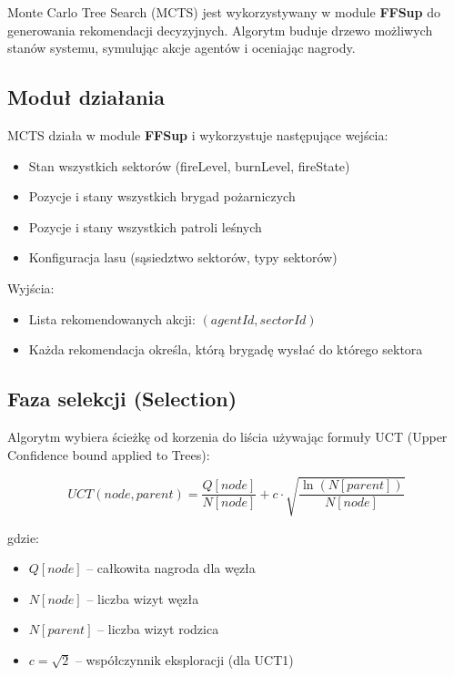 Monte Carlo Tree Search (MCTS) jest wykorzystywany w module \textbf{FFSup} do generowania rekomendacji decyzyjnych. Algorytm buduje drzewo możliwych stanów systemu, symulując akcje agentów i oceniając nagrody.

\subsection{Moduł działania}

MCTS działa w module \textbf{FFSup} i wykorzystuje następujące wejścia:
\begin{itemize}
    \item Stan wszystkich sektorów (fireLevel, burnLevel, fireState)
    \item Pozycje i stany wszystkich brygad pożarniczych
    \item Pozycje i stany wszystkich patroli leśnych
    \item Konfiguracja lasu (sąsiedztwo sektorów, typy sektorów)
\end{itemize}

Wyjścia:
\begin{itemize}
    \item Lista rekomendowanych akcji: $(agentId, sectorId)$
    \item Każda rekomendacja określa, którą brygadę wysłać do którego sektora
\end{itemize}

\subsection{Faza selekcji (Selection)}

Algorytm wybiera ścieżkę od korzenia do liścia używając formuły UCT (Upper Confidence bound applied to Trees):

\begin{equation}
UCT(node, parent) = \frac{Q[node]}{N[node]} + c \cdot \sqrt{\frac{\ln(N[parent])}{N[node]}}
\end{equation}

gdzie:
\begin{itemize}
    \item $Q[node]$ -- całkowita nagroda dla węzła
    \item $N[node]$ -- liczba wizyt węzła
    \item $N[parent]$ -- liczba wizyt rodzica
    \item $c = \sqrt{2}$ -- współczynnik eksploracji (dla UCT1)
\end{itemize}

